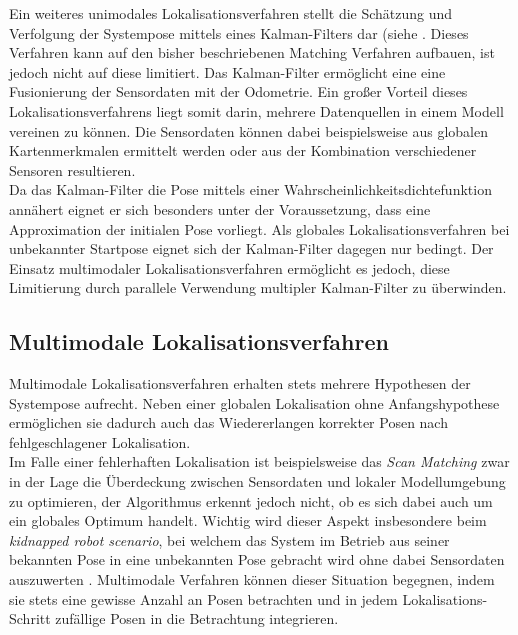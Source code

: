 Ein weiteres unimodales Lokalisationsverfahren stellt die Schätzung und Verfolgung der Systempose mittels eines Kalman-Filters dar (siehe . Dieses Verfahren kann auf den bisher beschriebenen Matching Verfahren aufbauen, ist jedoch nicht auf diese limitiert. Das Kalman-Filter ermöglicht eine eine Fusionierung der Sensordaten mit der Odometrie. Ein großer Vorteil dieses Lokalisationsverfahrens liegt somit darin, mehrere Datenquellen in einem Modell vereinen zu können. Die Sensordaten können dabei beispielsweise aus globalen Kartenmerkmalen ermittelt werden \cite{Leonard1991} oder aus der Kombination verschiedener Sensoren \cite{Roumeliotis1997} resultieren.\\
Da das Kalman-Filter die Pose mittels einer Wahrscheinlichkeitsdichtefunktion annähert eignet er sich besonders unter der Voraussetzung, dass eine Approximation der initialen Pose vorliegt. Als globales Lokalisationsverfahren bei unbekannter Startpose eignet sich der Kalman-Filter dagegen nur bedingt. Der Einsatz multimodaler Lokalisationsverfahren ermöglicht es jedoch, diese Limitierung durch parallele Verwendung multipler Kalman-Filter zu überwinden.

\subsection{Multimodale Lokalisationsverfahren}
Multimodale Lokalisationsverfahren erhalten stets mehrere Hypothesen der Systempose aufrecht. Neben einer globalen Lokalisation ohne Anfangshypothese ermöglichen sie dadurch auch das Wiedererlangen korrekter Posen nach fehlgeschlagener Lokalisation.\\
Im Falle einer fehlerhaften Lokalisation ist beispielsweise das \textit{Scan Matching} zwar in der Lage die Überdeckung zwischen Sensordaten und lokaler Modellumgebung zu optimieren, der Algorithmus erkennt jedoch nicht, ob es sich dabei auch um ein globales Optimum handelt. Wichtig wird dieser Aspekt insbesondere beim \textit{kidnapped robot scenario}, bei welchem das System im Betrieb aus seiner bekannten Pose in eine unbekannten Pose gebracht wird ohne dabei Sensordaten auszuwerten \cite{Yic2011}. Multimodale Verfahren können dieser Situation begegnen, indem sie stets eine gewisse Anzahl an Posen betrachten und in jedem Lokalisations-Schritt zufällige Posen in die Betrachtung integrieren.\\

